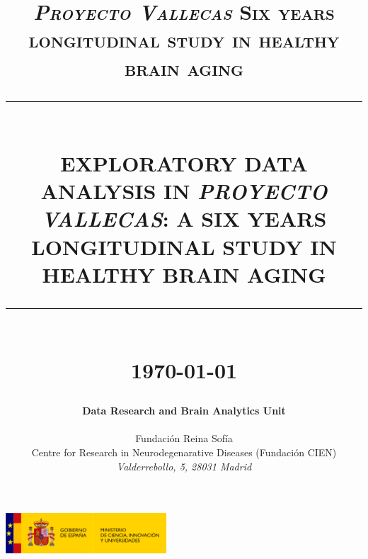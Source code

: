 \documentclass[11pt]{article}
\theoremstyle{definition}
\theoremstyle{remark}
\newcommand{\HRule}[1]{\rule{\linewidth}{#1}}
\begin{document}

\title{ \normalsize \textsc{\emph{Proyecto Vallecas} Six years longitudinal study in healthy brain aging}
    \\ [2.0cm]
    \HRule{0.5pt} \\
    \LARGE \textbf{\uppercase{Exploratory Data Analysis in \emph{Proyecto Vallecas}: a six years longitudinal study in healthy brain aging}}
    \HRule{2pt} \\ [0.5cm]
    \normalsize \today \vspace*{5\baselineskip}}

\date{ }
\author{
    \textbf{\large{Data Research and Brain Analytics Unit}}   \\  \\
    \large{Fundaci\'on Reina Sof\'ia} \\
    Centre for Research in Neurodegenarative Diseases (Fundaci\'on CIEN)
    \\ \emph{Valderrebollo, 5, 28031 Madrid}
 }


\maketitle
\begin{center}
\includegraphics[width = 60mm]{figures/logo_mciu.png}
\end{center}
\newpage
\tableofcontents
\newpage

\sectionfont{\scshape}
\end{document}
